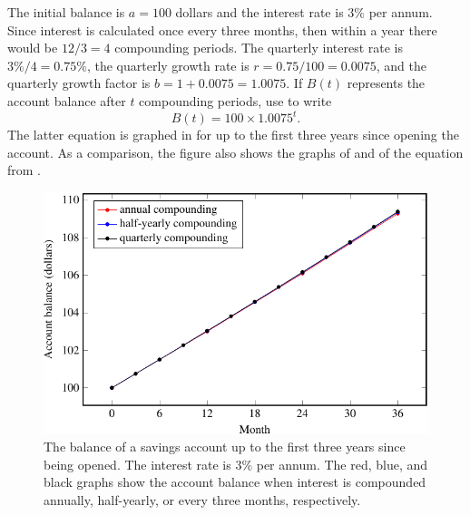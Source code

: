 \documentclass[a4paper,oneside,12pt]{article}
\begin{document}
\begin{solution}
The initial balance is $a = 100$ dollars and the interest rate is
$3\%$ per annum.  Since interest is calculated once every three
months, then within a year there would be $12 / 3 = 4$ compounding
periods.  The quarterly interest rate is $3\% / 4 = 0.75\%$, the
quarterly growth rate is $r = 0.75 / 100 = 0.0075$, and the quarterly
growth factor is $b = 1 + 0.0075 = 1.0075$.  If $B(t)$ represents the
account balance after $t$ compounding periods, use
 to write
\begin{equation}
\label{eqn:savings_quarterly_compounding}
B(t)
=
100 \times 1.0075^t.
\end{equation}
The latter equation is graphed in  for
up to the first three years since opening the account.  As a
comparison, the figure also shows the graphs of
 and of the equation from
.

\begin{figure}[!htbp]
\centering
\includegraphics[scale=1.1]{image/11/interest-quarterly.pdf}
\caption{%
  The balance of a savings account up to the first three years since
  being opened.  The interest rate is $3\%$ per annum.  The red, blue,
  and black graphs show the account balance when interest is
  compounded annually, half-yearly, or every three months,
  respectively.
}
\label{fig:savings_quarterly}
\end{figure}


\end{solution}
\end{document}
